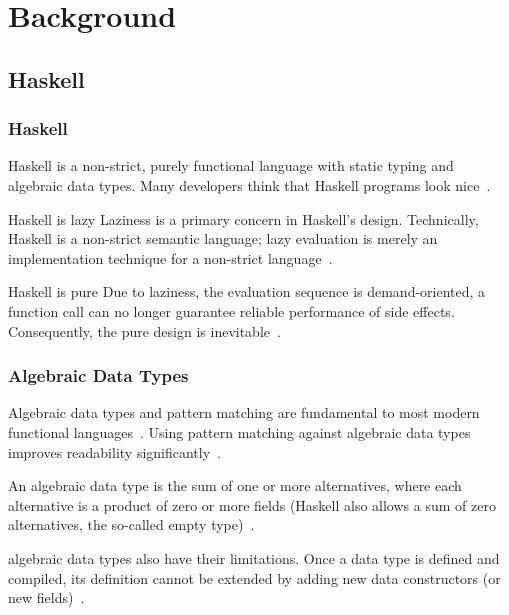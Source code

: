 \section{Background}

\subsection{Haskell}
\begin{frame}\frametitle{Haskell}

Haskell is a non-strict, purely functional language with static typing and algebraic data types. Many developers think that Haskell programs look nice~\cite{history-of-haskell}.

\footnotesize

\begin{block}{Haskell is lazy}
    Laziness is a primary concern in Haskell's design. Technically, Haskell is a non-strict semantic language; lazy evaluation is merely an implementation technique for a non-strict language~\cite{history-of-haskell}.
\end{block}

\begin{block}{Haskell is pure}
Due to laziness, the evaluation sequence is demand-oriented, a function call can no longer guarantee reliable performance of side effects. Consequently, the pure design is inevitable~\cite{history-of-haskell}.
\end{block}

\end{frame}

\begin{frame}\frametitle{Algebraic Data Types}

Algebraic data types and pattern matching are fundamental to most modern functional languages~\cite{trees-that-grow}. Using pattern matching against algebraic data types improves readability significantly~\cite{history-of-haskell}.

An algebraic data type is the sum of one or more alternatives, where each alternative is a product of zero or more fields (Haskell also allows a sum of zero alternatives, the so-called empty type)~\cite{history-of-haskell}. 
        

algebraic data types also have their limitations. Once a data type is defined and compiled, its definition cannot be extended by adding new data constructors (or new fields)~\cite{trees-that-grow}.

\end{frame}

